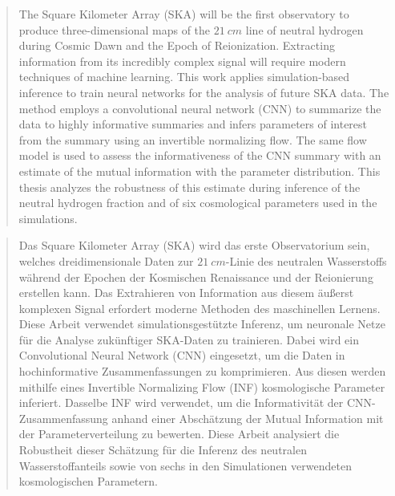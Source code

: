 \begin{abstract}
The Square Kilometer Array (SKA) will be the first observatory to produce three-dimensional maps of the $21~\si{cm}$ line of neutral hydrogen during Cosmic Dawn and the Epoch of Reionization. Extracting information from its incredibly complex signal will require modern techniques of machine learning. This work applies simulation-based inference to train neural networks for the analysis of future SKA data. The method employs a convolutional neural network (CNN) to summarize the data to highly informative summaries and infers parameters of interest from the summary using an invertible normalizing flow. The same flow model is used to assess the informativeness of the CNN summary with an estimate of the mutual information with the parameter distribution. This thesis analyzes the robustness of this estimate during inference of the neutral hydrogen fraction and of six cosmological parameters used in the simulations.
\end{abstract}

\begin{abstract}
Das Square Kilometer Array (SKA) wird das erste Observatorium sein, welches dreidimensionale Daten zur $21~\si{cm}$-Linie des neutralen Wasserstoffs während der Epochen der Kosmischen Renaissance und der Reionierung erstellen kann. Das Extrahieren von Information aus diesem äußerst komplexen Signal erfordert moderne Methoden des maschinellen Lernens. Diese Arbeit verwendet simulationsgestützte Inferenz, um neuronale Netze für die Analyse zukünftiger SKA-Daten zu trainieren. Dabei wird ein Convolutional Neural Network (CNN) eingesetzt, um die Daten in hochinformative Zusammenfassungen zu komprimieren. Aus diesen werden mithilfe eines Invertible Normalizing Flow (INF) kosmologische Parameter inferiert. Dasselbe INF wird verwendet, um die Informativität der CNN-Zusammenfassung anhand einer Abschätzung der Mutual Information mit der Parameterverteilung zu bewerten. Diese Arbeit analysiert die Robustheit dieser Schätzung für die Inferenz des neutralen Wasserstoffanteils sowie von sechs in den Simulationen verwendeten kosmologischen Parametern.
\end{abstract}